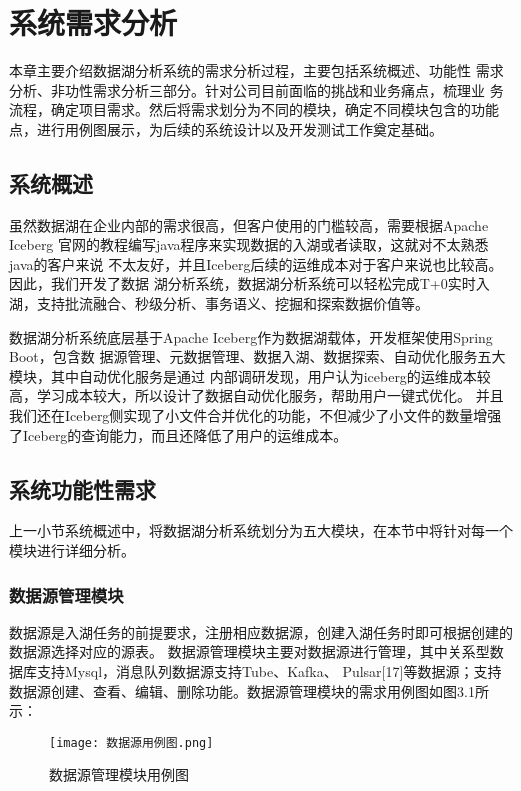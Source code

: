 
\chapter{系统需求分析}

本章主要介绍数据湖分析系统的需求分析过程，主要包括系统概述、功能性
需求分析、非功性需求分析三部分。针对公司目前面临的挑战和业务痛点，梳理业
务流程，确定项目需求。然后将需求划分为不同的模块，确定不同模块包含的功能
点，进行用例图展示，为后续的系统设计以及开发测试工作奠定基础。

\section{系统概述}

虽然数据湖在企业内部的需求很高，但客户使用的门槛较高，需要根据Apache Iceberg
官网的教程编写java程序来实现数据的入湖或者读取，这就对不太熟悉java的客户来说
不太友好，并且Iceberg后续的运维成本对于客户来说也比较高。因此，我们开发了数据
湖分析系统，数据湖分析系统可以轻松完成T+0实时入湖，支持批流融合、秒级分析、事务语义、挖掘和探索数据价值等。

数据湖分析系统底层基于Apache Iceberg作为数据湖载体，开发框架使用Spring Boot，包含数
据源管理、元数据管理、数据入湖、数据探索、自动优化服务五大模块，其中自动优化服务是通过
内部调研发现，用户认为iceberg的运维成本较高，学习成本较大，所以设计了数据自动优化服务，帮助用户一键式优化。
并且我们还在Iceberg侧实现了小文件合并优化的功能，不但减少了小文件的数量增强了Iceberg的查询能力，而且还降低了用户的运维成本。

\section{系统功能性需求}

上一小节系统概述中，将数据湖分析系统划分为五大模块，在本节中将针对每一个模块进行详细分析。

\subsection{数据源管理模块}

数据源是入湖任务的前提要求，注册相应数据源，创建入湖任务时即可根据创建的数据源选择对应的源表。
数据源管理模块主要对数据源进行管理，其中关系型数据库支持Mysql，消息队列数据源支持Tube、Kafka、
Pulsar[17]等数据源；支持数据源创建、查看、编辑、删除功能。数据源管理模块的需求用例图如图3.1所示：

\begin{figure}[h]
  \centering
  \texttt{[image: 数据源用例图.png]}
  \caption{数据源管理模块用例图}
  \label{fig:badge}
\end{figure}

